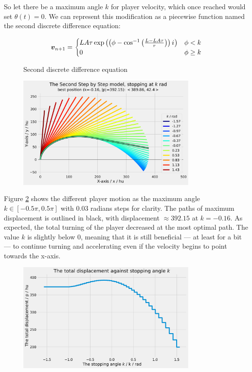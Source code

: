 So let there be a maximum angle $k$ for player velocity, which once reached would set $\theta(t) = 0$. We can represent this modification as a piecewise function named the second discrete difference equation:

\begin{figure}[H]
    \centering
    \[
        \boldsymbol{v}_{n+1} = \begin{cases}
            LA\tau \exp\left(\left(\phi - \cos^{-1}\left(\frac{L-LA\tau}{r}\right)\right) {i\mkern1mu}\right) & \phi < k\\
            0 & \phi \geq k
        \end{cases}
    \]
    \caption{Second discrete difference equation}
    \label{fig:ssbs}
\end{figure}



\begin{figure}[H]
    \centering
    \includegraphics[width=0.8\textwidth]{assets/step_by_step_2.png}
    \caption{}
    \label{fig:sbs2}
\end{figure}

Figure \ref{fig:sbs2} shows the different player motion as the maximum angle $k\in [-0.5\pi, 0.5\pi]$ with $0.03$ radians steps for clarity. The paths of maximum displacement is outlined in black, with displacement $\approx 392.15$ at $k=-0.16$. As expected, the total turning of the player decreased at the most optimal path. The value $k$ is slightly below $0$, meaning that it is still beneficial --- at least for a bit --- to continue turning and accelerating even if the velocity begins to point towards the x-axis.

\begin{figure}[H]
    \centering
    \includegraphics[width=0.8\textwidth]{assets/step_by_step_2k.png}
    \caption{}
    \label{fig:sbs2k}
\end{figure}

